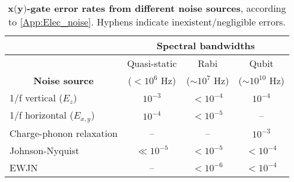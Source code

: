 \documentclass[aps,prb,superscriptaddress,nobibnotes,twocolumn]{revtex4-1}
\begin{document}
\begin{table}
	\begin{tabular}{p{1.15in}b{.7in}b{.65in}b{.7in}} %
		\arrayrulecolor{white}
		{} & \multicolumn{3}{c}{\cellcolor[rgb]{.17,.54,.57}\textbf{\color{white}Spectral bandwidths}} \\ \hline 
		{\cellcolor[rgb]{.13,.43,.64}} & \multicolumn{1}{c}{\cellcolor[rgb]{.36,.77,.8}Quasi-static} &\multicolumn{1}{c}{\cellcolor[rgb]{.36,.77,.8}Rabi} & \multicolumn{1}{c}{\cellcolor[rgb]{.36,.77,.8}Qubit} \\
		\multicolumn{1}{c}{\cellcolor[rgb]{.13,.43,.64}\textbf{\color{white}Noise source}} & \multicolumn{1}{c}{\cellcolor[rgb]{.36,.77,.8}($<10^{6}$ Hz)} & \multicolumn{1}{c}{\cellcolor[rgb]{.36,.77,.8}($\sim10^{7}$ Hz)} & \multicolumn{1}{c}{\cellcolor[rgb]{.36,.77,.8}($\sim10^{10}$ Hz)} \\ \hline\hline
		\cellcolor[rgb]{.4,.68,.87} 1/f vertical ($E_z$) & \multicolumn{1}{c}{\cellcolor[rgb]{.93,.85,.63}$10^{-3}$} & \multicolumn{1}{c}{\cellcolor[rgb]{.93,.85,.63}$<10^{-4}$} & \multicolumn{1}{c}{\cellcolor[rgb]{.93,.85,.63}$10^{-4}$} \\ \hline 
		\cellcolor[rgb]{.4,.68,.87} 1/f horizontal ($E_{x,y}$) & \multicolumn{1}{c}{\cellcolor[rgb]{.93,.85,.63}$10^{-4}$} & \multicolumn{1}{c}{\cellcolor[rgb]{.93,.85,.63}$<10^{-5}$} & \multicolumn{1}{c}{\cellcolor[rgb]{.93,.85,.63}--} \\ \hline 
		\cellcolor[rgb]{.4,.68,.87} Charge-phonon relaxation & \multicolumn{1}{c}{\cellcolor[rgb]{.93,.85,.63}--} & \multicolumn{1}{c}{\cellcolor[rgb]{.93,.85,.63}--} & \multicolumn{1}{c}{\cellcolor[rgb]{.93,.85,.63}$10^{-3}$} \\ \hline 
		\cellcolor[rgb]{.4,.68,.87} Johnson-Nyquist & \multicolumn{1}{c}{\cellcolor[rgb]{.93,.85,.63}$\ll10^{-5}$} & \multicolumn{1}{c}{\cellcolor[rgb]{.93,.85,.63}$<10^{-5}$} & \multicolumn{1}{c}{\cellcolor[rgb]{.93,.85,.63}$<10^{-4}$} \\ \hline 
		\cellcolor[rgb]{.4,.68,.87} EWJN & \multicolumn{1}{c}{\cellcolor[rgb]{.93,.85,.63}--} & \multicolumn{1}{c}{\cellcolor[rgb]{.93,.85,.63}$<10^{-6}$} & \multicolumn{1}{c}{\cellcolor[rgb]{.93,.85,.63}$<10^{-4}$} \\ \hline 
	\end{tabular}
	\caption{\textbf{$\textbf{x(y)}$-gate error rates from different noise sources}, according to \ref{App:Elec_noise}. Hyphens indicate inexistent/negligible errors.}
	\label{table:xy-gate-errors}
\end{table}
\end{document}
